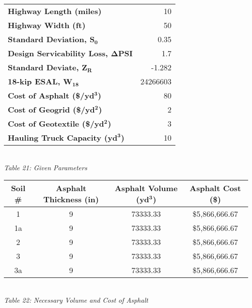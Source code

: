 \documentclass{article}
\begin{document}
\begin{center}
    \newpage
    \begin{tabular}{|l|r|}
        \hline
        \textbf{Highway Length (miles)}                               & 10  \\
        \textbf{Highway Width (ft)}                                      & 50  \\
        \textbf{Standard Deviation, $\bm{S_0}$}                   & 0.35  \\
        \textbf{Design Servicability Loss, $\bm{\Delta PSI}$}                            & 1.7  \\
        \textbf{Standard Deviate, $\bm{Z_R}$}                               & -1.282  \\
        \textbf{18-kip ESAL, $\bm{W_{18}}$}                            & 24266603  \\
        \textbf{Cost of Asphalt (\$/yd$\bm{^3}$)}                     & 80  \\
        \textbf{Cost of Geogrid (\$/yd$\bm{^2}$)}                 & 2 \\
        \textbf{Cost of Geotextile (\$/yd$\bm{^2}$)}   & 3\\
        \textbf{Hauling Truck Capacity ($\bm{\textbf{yd}^3}$)} & 10 \\\hline
    \end{tabular}
    \vspace{3mm}
    \emph{\\Table 21: Given Parameters\\}
    \vspace{7mm}
    \begin{tabular}{|c|ccc|}
        \hline
        \textbf{Soil \#} & \textbf{Asphalt Thickness (in)} & \textbf{Asphalt Volume (yd$\bm{^3}$)} & \textbf{Asphalt Cost (\$)}  \\\hline
        1  & 9 & 73333.33 & \$5,866,666.67  \\
        1a & 9 & 73333.33 & \$5,866,666.67    \\
        2  & 9 & 73333.33 & \$5,866,666.67    \\
        3  & 9 & 73333.33 & \$5,866,666.67    \\
        3a & 9 & 73333.33 & \$5,866,666.67 \\\hline
    \end{tabular}
    \vspace{3mm}
    \emph{\\Table 22: Necessary Volume and Cost of Asphalt\\}

\end{center}
\end{document}
